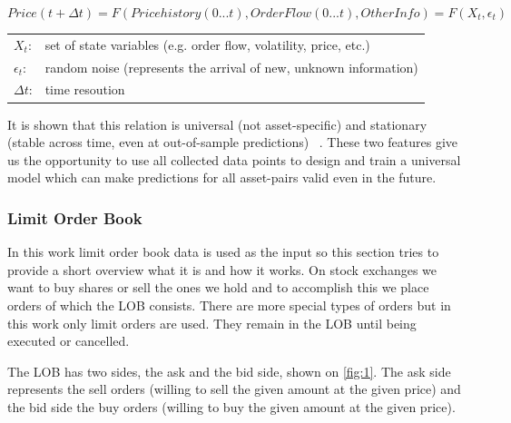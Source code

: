 \documentclass[11pt,a4paper,oneside]{article}
\begin{document}
  \begin{equation}
    Price(t+\Delta t) = F(Price history(0...t), Order Flow(0...t), Other Info) = F(X_{t}, \epsilon_{t})
    \label{eq:price_form}
  \end{equation}


  \begin{center}
    \begin{tabular}{l l}
      $X_{t}$: & set of state variables (e.g. order flow, volatility, price, etc.) \\
      $\epsilon_{t}$: & random noise (represents the arrival of new, unknown information) \\
      $\Delta t$: & time resoution
    \end{tabular}
  \end{center}

  \bigskip

  It is shown that this relation is universal (not asset-specific) and stationary (stable across time, even at 
  out-of-sample predictions) ~\cite{univ}. These two features give us the opportunity to use all collected data points 
  to design and train a universal model which can make predictions for all asset-pairs valid even in the future.

  \subsubsection{Limit Order Book}
  \label{sec:limit_order_book}
  
  In this work limit order book data is used as the input so this section tries to provide a short overview what it is 
  and how it works. On stock exchanges we want to buy shares or sell the ones we hold and to accomplish this we place 
  orders of which the LOB consists. There are more special types of orders but in this work only limit orders are used. 
  They remain in the LOB until being executed or cancelled.
  
  The LOB has two sides, the ask and the bid side, shown on \autoref{fig:1}. The ask side represents the sell orders 
  (willing to sell the given amount at the given price) and the bid side the buy orders (willing to buy the given amount 
  at the given price).
\end{document}
